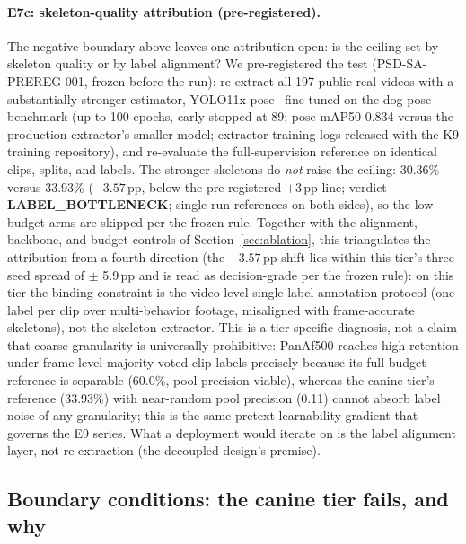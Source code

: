\paragraph{E7c: skeleton-quality attribution (pre-registered).}
The negative boundary above leaves one attribution open: is the ceiling set by skeleton quality or by label alignment? We pre-registered the test (PSD-SA-PREREG-001, frozen before the run): re-extract all 197 public-real videos with a substantially stronger estimator, YOLO11x-pose~\citep{jocher2024yolo11} fine-tuned on the dog-pose benchmark (up to 100 epochs, early-stopped at 89; pose mAP50 0.834 versus the production extractor's smaller model; extractor-training logs released with the K9 training repository), and re-evaluate the full-supervision reference on identical clips, splits, and labels. The stronger skeletons do \emph{not} raise the ceiling: 30.36\% versus 33.93\% ($-3.57$\,pp, below the pre-registered $+3$\,pp line; verdict \textbf{LABEL\_BOTTLENECK}; single-run references on both sides), so the low-budget arms are skipped per the frozen rule. Together with the alignment, backbone, and budget controls of Section~\ref{sec:ablation}, this triangulates the attribution from a fourth direction (the $-3.57$\,pp shift lies within this tier's three-seed spread of $\pm$ 5.9\,pp and is read as decision-grade per the frozen rule): on this tier the binding constraint is the video-level single-label annotation protocol (one label per clip over multi-behavior footage, misaligned with frame-accurate skeletons), not the skeleton extractor. This is a tier-specific diagnosis, not a claim that coarse granularity is universally prohibitive: PanAf500 reaches high retention under frame-level majority-voted clip labels precisely because its full-budget reference is separable (60.0\%, pool precision viable), whereas the canine tier's reference (33.93\%) with near-random pool precision (0.11) cannot absorb label noise of any granularity; this is the same pretext-learnability gradient that governs the E9 series. What a deployment would iterate on is the label alignment layer, not re-extraction (the decoupled design's premise).

\subsection{Boundary conditions: the canine tier fails, and why}\label{ssec:boundary}

